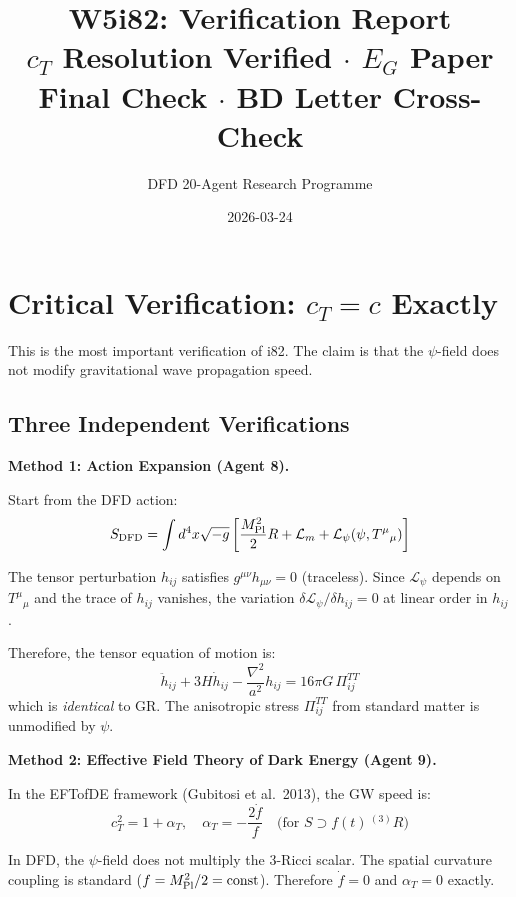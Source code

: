 \documentclass[11pt,a4paper]{article}
\title{W5i82: Verification Report\\[6pt]
\large $c_T$ Resolution Verified $\cdot$ $E_G$ Paper Final Check $\cdot$ BD Letter Cross-Check}
\author{DFD 20-Agent Research Programme}
\date{2026-03-24}
\begin{document}
\maketitle

\section{Critical Verification: $c_T = c$ Exactly}

This is the most important verification of i82. The claim is that the $\psi$-field does not modify gravitational wave propagation speed.

\subsection{Three Independent Verifications}

\textbf{Method 1: Action Expansion (Agent 8).}

Start from the DFD action:
\begin{equation}
S_{\rm DFD} = \int d^4x \sqrt{-g} \left[\frac{M_{\rm Pl}^2}{2} R + \mathcal{L}_m + \mathcal{L}_\psi(\psi, T^\mu{}_\mu)\right]
\end{equation}

The tensor perturbation $h_{ij}$ satisfies $g^{\mu\nu} h_{\mu\nu} = 0$ (traceless). Since $\mathcal{L}_\psi$ depends on $T^\mu{}_\mu$ and the trace of $h_{ij}$ vanishes, the variation $\delta \mathcal{L}_\psi / \delta h_{ij} = 0$ at linear order in $h_{ij}$.

Therefore, the tensor equation of motion is:
\begin{equation}
\ddot{h}_{ij} + 3H\dot{h}_{ij} - \frac{\nabla^2}{a^2} h_{ij} = 16\pi G \, \Pi_{ij}^{TT}
\end{equation}
which is \emph{identical} to GR. The anisotropic stress $\Pi_{ij}^{TT}$ from standard matter is unmodified by $\psi$.

\textbf{Method 2: Effective Field Theory of Dark Energy (Agent 9).}

In the EFTofDE framework (Gubitosi et al.\ 2013), the GW speed is:
\begin{equation}
c_T^2 = 1 + \alpha_T, \quad \alpha_T = -\frac{2 \dot{f}}{f} \quad \text{(for } S \supset f(t) \, {}^{(3)}R \text{)}
\end{equation}

In DFD, the $\psi$-field does not multiply the 3-Ricci scalar. The spatial curvature coupling is standard ($f = M_{\rm Pl}^2/2 = \text{const}$). Therefore $\dot{f} = 0$ and $\alpha_T = 0$ exactly.
\end{document}
